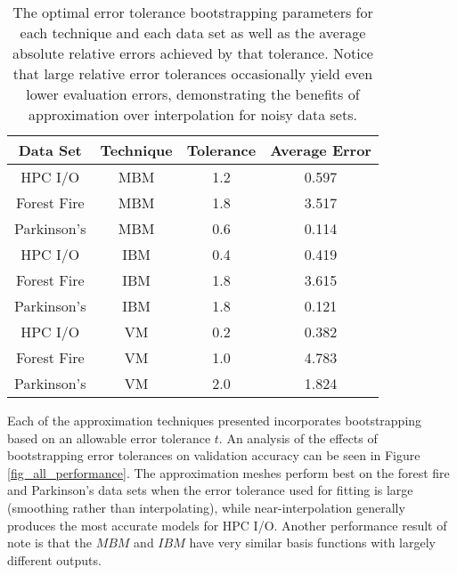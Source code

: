 \begin{table}
  \centering
  \begin{tabular}{c|c|c|c}
    \hline
    \textbf{Data Set} & \textbf{Technique} & \textbf{Tolerance} & \textbf{Average Error}\\
    \hline
    HPC I/O & MBM & 1.2 & 0.597\\
    Forest Fire & MBM & 1.8 & 3.517\\
    Parkinson's & MBM & 0.6 & 0.114\\
    \hline
    HPC I/O & IBM & 0.4 & 0.419\\
    Forest Fire & IBM & 1.8 & 3.615\\
    Parkinson's & IBM & 1.8 & 0.121\\
    \hline
    HPC I/O & VM & 0.2 & 0.382\\
    Forest Fire & VM & 1.0 & 4.783\\
    Parkinson's & VM & 2.0 & 1.824\\
    \hline
  \end{tabular}
  \caption{The optimal error tolerance bootstrapping parameters for each technique and each data set as well as the average absolute relative errors achieved by that tolerance. Notice that large relative error tolerances occasionally yield even lower evaluation errors, demonstrating the benefits of approximation over interpolation for noisy data sets.
  \vspace{-.5cm}}
  \label{tab_optimal_tolerance}
\end{table}

Each of the approximation techniques presented incorporates bootstrapping based on an allowable error tolerance $t$. An analysis of the effects of bootstrapping error tolerances on validation accuracy can be seen in Figure \ref{fig_all_performance}. The approximation meshes perform best on the forest fire and Parkinson's data sets when the error tolerance used for fitting is large (smoothing rather than interpolating), while near-interpolation generally produces the most accurate models for HPC I/O. Another performance result of note is that the $MBM$ and $IBM$ have very similar basis functions with largely different outputs.

\begin{figure*}
  \caption{The performance of all three techniques with varied relative error tolerance for the bootstrapping parameter. The columns are for Max Box Mesh, Iterative Box Mesh, and Voronoi Mesh, respectively. The rows are for HPC I/O, Forest Fire, and Parkinson's respectively. Notice the techniques' behavior on the Parkinson's and Forest Fire data sets, performance increases with larger error tolerance.}
  \label{fig_all_performance}
\end{figure*}

